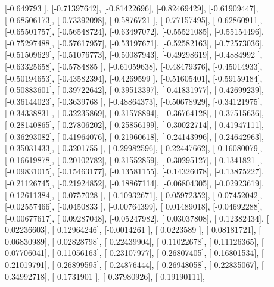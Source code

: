\documentclass{article}
\begin{document}
       [-0.649793  ],
       [-0.71397642],
       [-0.81422696],
       [-0.82469429],
       [-0.61909447],
       [-0.68506173],
       [-0.73392098],
       [-0.5876721 ],
       [-0.77157495],
       [-0.62860911],
       [-0.65501757],
       [-0.56548724],
       [-0.63497072],
       [-0.55521085],
       [-0.55154496],
       [-0.75297488],
       [-0.57617957],
       [-0.53197671],
       [-0.52582163],
       [-0.72573036],
       [-0.51509629],
       [-0.51076773],
       [-0.50087943],
       [-0.49298619],
       [-0.4884992 ],
       [-0.63325658],
       [-0.5784885 ],
       [-0.61059638],
       [-0.48479376],
       [-0.45014933],
       [-0.50194653],
       [-0.43582394],
       [-0.4269599 ],
       [-0.51605401],
       [-0.59159184],
       [-0.50883601],
       [-0.39722642],
       [-0.39513397],
       [-0.41831977],
       [-0.42699239],
       [-0.36144023],
       [-0.3639768 ],
       [-0.48864373],
       [-0.50678929],
       [-0.34121975],
       [-0.34338831],
       [-0.32235869],
       [-0.31578894],
       [-0.36764128],
       [-0.37515636],
       [-0.28140865],
       [-0.27806202],
       [-0.25856199],
       [-0.30022714],
       [-0.41947111],
       [-0.36293082],
       [-0.41964076],
       [-0.21960618],
       [-0.24143996],
       [-0.24642963],
       [-0.35031433],
       [-0.3201755 ],
       [-0.29982596],
       [-0.22447662],
       [-0.16080079],
       [-0.16619878],
       [-0.20102782],
       [-0.31552859],
       [-0.30295127],
       [-0.1341821 ],
       [-0.09831015],
       [-0.15463177],
       [-0.13581155],
       [-0.14326078],
       [-0.13875227],
       [-0.21126745],
       [-0.21924852],
       [-0.18867114],
       [-0.06804305],
       [-0.02923619],
       [-0.12611384],
       [-0.0757028 ],
       [-0.10932671],
       [-0.05972352],
       [-0.07452042],
       [-0.02557466],
       [-0.0450833 ],
       [-0.00764399],
       [ 0.01489018],
       [-0.04692288],
       [-0.00677617],
       [ 0.09287048],
       [-0.05247982],
       [ 0.03037808],
       [ 0.12382434],
       [ 0.02236603],
       [ 0.12964246],
       [-0.0014261 ],
       [ 0.0223589 ],
       [ 0.08181721],
       [ 0.06830989],
       [ 0.02828798],
       [ 0.22439904],
       [ 0.11022678],
       [ 0.11126365],
       [ 0.07706041],
       [ 0.11056163],
       [ 0.23107977],
       [ 0.26807405],
       [ 0.16801534],
       [ 0.21019791],
       [ 0.26899595],
       [ 0.24876444],
       [ 0.26948058],
       [ 0.22835067],
       [ 0.34992718],
       [ 0.1731901 ],
       [ 0.37980926],
       [ 0.19190111],
\end{document}
